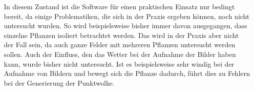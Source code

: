 \documentclass[12pt,titlepage, twoside]{article}
\begin{document}
In diesem Zustand ist die Software für einen praktischen Einsatz nur bedingt bereit, da einige Problematiken, die sich in der Praxis ergeben können, noch nicht untersucht wurden.
So wird beispielsweise bisher immer davon ausgegangen, dass einzelne Pflanzen isoliert betrachtet werden. Das wird in der Praxis aber nicht der Fall sein, da auch ganze Felder mit mehreren Pflanzen untersucht werden sollen.
Auch der Einfluss, den das Wetter bei der Aufnahme der Bilder haben kann, wurde bisher nicht untersucht. 
Ist es beispielsweise sehr windig bei der Aufnahme von Bildern und bewegt sich die Pflanze dadurch, führt dies zu Fehlern bei der Generierung der Punktwolke.

\newpage



\end{document}
